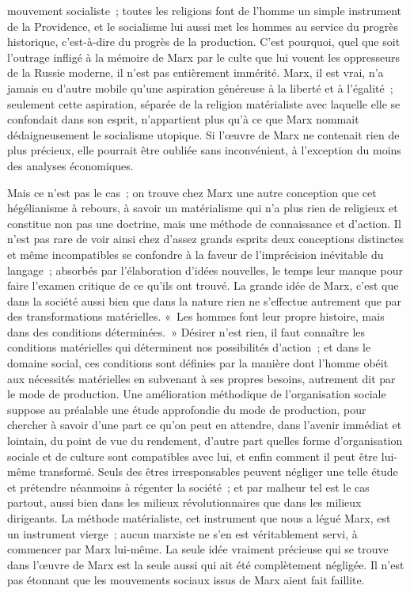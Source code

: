 \documentclass[french,twoside]{book} %
\begin{document}
mouvement socialiste ; toutes les religions font de l'homme un simple instrument de la Providence, et le socialisme lui aussi met les hommes au service du progrès historique, c'est-à-dire du progrès de la production. C'est pourquoi, quel que soit l'outrage infligé à la mémoire de Marx par le culte que lui vouent les oppresseurs de la Russie moderne, il n'est pas entièrement immérité. Marx, il est vrai, n'a jamais eu d'autre mobile qu'une aspiration généreuse à la liberté et à l'égalité ; seulement cette aspiration, séparée de la religion matérialiste avec laquelle elle se confondait dans son esprit, n'appartient plus qu'à ce que Marx nommait dédaigneusement le socialisme utopique. Si l'œuvre de Marx ne contenait rien de plus précieux, elle pourrait être oubliée sans inconvénient, à l'exception du moins des analyses économiques.\par
Mais ce n'est pas le cas ; on trouve chez Marx une autre conception que cet hégélianisme à rebours, à savoir un matérialisme qui n'a plus rien de religieux et constitue non pas une doctrine, mais une méthode de connaissance et d'action. Il n'est pas rare de voir ainsi chez d'assez grands esprits deux conceptions distinctes et même incompatibles se confondre à la faveur de l'imprécision inévitable du langage ; absorbés par l'élaboration d'idées nouvelles, le temps leur manque pour faire l'examen critique de ce qu'ils ont trouvé. La grande idée de Marx, c'est que dans la société aussi bien que dans la nature rien ne s'effectue autrement que par des transformations matérielles. « Les hommes font leur propre histoire, mais dans des conditions déterminées. » Désirer n'est rien, il faut connaître les conditions matérielles qui déterminent nos possibilités d'action ; et dans le domaine social, ces conditions sont définies par la manière dont l'homme obéit aux nécessités matérielles en subvenant à ses propres besoins, autrement dit par le mode de production. Une amélioration méthodique de l'organisation sociale suppose au préalable une étude approfondie du mode de production, pour chercher à savoir d'une part ce qu'on peut en attendre, dans l'avenir immédiat et lointain, du point de vue du rendement, d'autre part quelles forme d'organisation sociale et de culture sont compatibles avec lui, et enfin comment il peut être lui-même transformé. Seuls des êtres irresponsables peuvent négliger une telle étude et prétendre néanmoins à régenter la société ; et par malheur tel est le cas partout, aussi bien dans les milieux révolutionnaires que dans les milieux dirigeants. La méthode matérialiste, cet instrument que nous a légué Marx, est un instrument vierge ; aucun marxiste ne s'en est véritablement servi, à commencer par Marx lui-même. La seule idée vraiment précieuse qui se trouve dans l'œuvre de Marx est la seule aussi qui ait été complètement négligée. Il n'est pas étonnant que les mouvements sociaux issus de Marx aient fait faillite.\par
\end{document}
